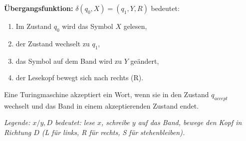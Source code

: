 \documentclass{article}
\begin{document}
\begin{minipage}[t]{0.45\textwidth}
    \textbf{Übergangsfunktion:} $\delta(q_0, X) = (q_1, Y, R)$ bedeutet:
    \begin{enumerate}
        \item Im Zustand $q_0$ wird das Symbol $X$ gelesen,
        \item der Zustand wechselt zu $q_1$,
        \item das Symbol auf dem Band wird zu $Y$ geändert,
        \item der Lesekopf bewegt sich nach rechts (R).
    \end{enumerate}
    Eine Turingmaschine akzeptiert ein Wort, wenn sie in den Zustand $q_{accept}$ wechselt und das Band in einem akzeptierenden Zustand endet.
    \begin{center}
    \end{center}
    \textit{Legende: $x/y,D$ bedeutet: lese $x$, schreibe $y$ auf das Band, bewege den Kopf in Richtung $D$ (L für links, R für rechts, S für stehenbleiben).}
\end{minipage}
\end{document}
